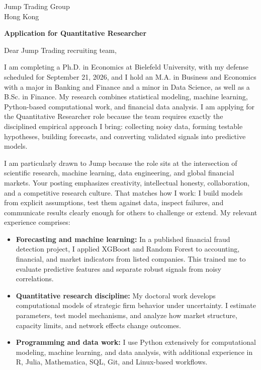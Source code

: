 \documentclass[11pt]{article}
\begin{document}
\vspace{0.1cm}

\vspace{0.1cm}

\noindent
Jump Trading Group \\
Hong Kong

\vspace{0.12cm}

\noindent
\textbf{Application for Quantitative Researcher}

\vspace{0.1cm}

\noindent Dear Jump Trading recruiting team,

I am completing a Ph.D. in Economics at Bielefeld University, with my defense scheduled for September 21, 2026, 
and I hold an M.A. in Business and Economics with a major in Banking and Finance and a minor in Data Science, as well as a B.Sc. in Finance. 
My research combines statistical modeling, machine learning, Python-based computational work, and financial data analysis. 
I am applying for the Quantitative Researcher role because the team requires exactly the disciplined empirical approach I bring: 
collecting noisy data, forming testable hypotheses, building forecasts, and converting validated signals into predictive models.

I am particularly drawn to Jump because the role sits at the intersection of scientific research, 
machine learning, data engineering, and global financial markets. 
Your posting emphasizes creativity, intellectual honesty, collaboration, and a competitive research culture. 
That matches how I work: I build models from explicit assumptions, test them against data, inspect failures, 
and communicate results clearly enough for others to challenge or extend.
My relevant experience comprises:

\begin{itemize}
    \item \textbf{Forecasting and machine learning:} In a published financial fraud detection project, I applied XGBoost and Random Forest to accounting, financial, and market indicators from listed companies. This trained me to evaluate predictive features and separate robust signals from noisy correlations.
    \item \textbf{Quantitative research discipline:} My doctoral work develops computational models of strategic firm behavior under uncertainty. I estimate parameters, test model mechanisms, and analyze how market structure, capacity limits, and network effects change outcomes.
    \item \textbf{Programming and data work:} I use Python extensively for computational modeling, machine learning, and data analysis, with additional experience in R, Julia, Mathematica, SQL, Git, and Linux-based workflows.
\end{itemize}
\end{document}
